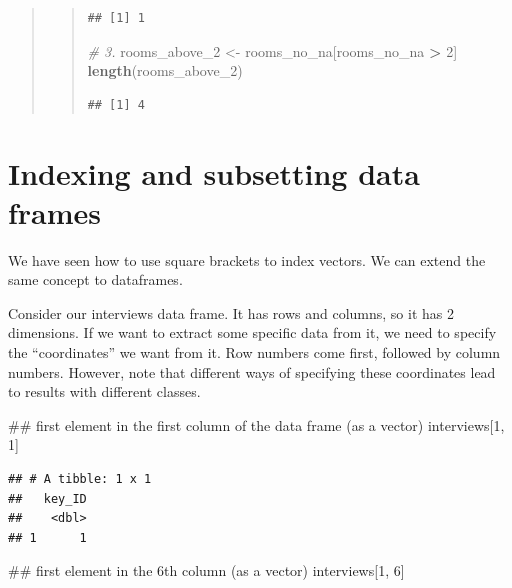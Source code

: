 \documentclass[]{book}
\newenvironment{Shaded}{\begin{snugshade}}{\end{snugshade}}
\newcommand{\KeywordTok}[1]{\textcolor[rgb]{0.13,0.29,0.53}{\textbf{#1}}}
\newcommand{\DecValTok}[1]{\textcolor[rgb]{0.00,0.00,0.81}{#1}}
\newcommand{\StringTok}[1]{\textcolor[rgb]{0.31,0.60,0.02}{#1}}
\newcommand{\CommentTok}[1]{\textcolor[rgb]{0.56,0.35,0.01}{\textit{#1}}}
\newcommand{\OperatorTok}[1]{\textcolor[rgb]{0.81,0.36,0.00}{\textbf{#1}}}
\newcommand{\NormalTok}[1]{#1}
\begin{document}
\begin{quote}
\begin{quote}
\begin{verbatim}
## [1] 1
\end{verbatim}

\begin{Shaded}
\begin{Highlighting}[]
\CommentTok{# 3.}
\NormalTok{rooms_above_}\DecValTok{2}\NormalTok{ <-}\StringTok{ }\NormalTok{rooms_no_na[rooms_no_na }\OperatorTok{>}\StringTok{ }\DecValTok{2}\NormalTok{]}
\KeywordTok{length}\NormalTok{(rooms_above_}\DecValTok{2}\NormalTok{)}
\end{Highlighting}
\end{Shaded}

\begin{verbatim}
## [1] 4
\end{verbatim}
\end{quote}
\end{quote}

\section{Indexing and subsetting data
frames}\label{indexing-and-subsetting-data-frames}

We have seen how to use square brackets to index vectors. We can extend
the same concept to dataframes.

Consider our interviews data frame. It has rows and columns, so it has 2
dimensions. If we want to extract some specific data from it, we need to
specify the ``coordinates'' we want from it. Row numbers come first,
followed by column numbers. However, note that different ways of
specifying these coordinates lead to results with different classes.

\begin{Shaded}
\begin{Highlighting}[]
\NormalTok{## first element in the first column of the data frame (as a vector)}
\NormalTok{interviews[}\DecValTok{1}\NormalTok{, }\DecValTok{1}\NormalTok{]}
\end{Highlighting}
\end{Shaded}

\begin{verbatim}
## # A tibble: 1 x 1
##   key_ID
##    <dbl>
## 1      1
\end{verbatim}

\begin{Shaded}
\begin{Highlighting}[]
\NormalTok{## first element in the 6th column (as a vector)}
\NormalTok{interviews[}\DecValTok{1}\NormalTok{, }\DecValTok{6}\NormalTok{]}
\end{Highlighting}
\end{Shaded}
\end{document}
